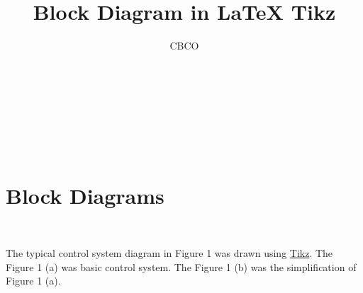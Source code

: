 \documentclass[10pt,a4paper]{article}
\author{CBCO}
\title{Block Diagram in LaTeX Tikz}
\begin{document}
                                                              
\maketitle

\noindent \newcommand\CWht[1][2.5]{\tikz[baseline=-#1]{\draw[thick](0,0)     circle[radius=1.5mm];}}
 \par \ \par\noindent \newcommand\CBlk[1][2.5]{\tikz[baseline=-#1]{\draw[thick,    fill=black!](0,0) circle[radius=1.5mm];}}
 \par \ \par\noindent \begin{CJK*}{UTF8}{gbsn}
 \par \ \par\noindent \section{Block Diagrams }
 \par \ \par\noindent The typical control system diagram in Figure 1 was drawn using \href{ https://tex.stackexchange.com/questions/175969/block-diagrams-using-tikz}{Tikz}. The Figure 1 (a) was basic control system. The Figure 1 (b) was the simplification of Figure 1 (a). 

 \par \ \par\noindent \begin{figure}[H] \centering 


\end{figure}
\end{CJK*}
\end{document}
